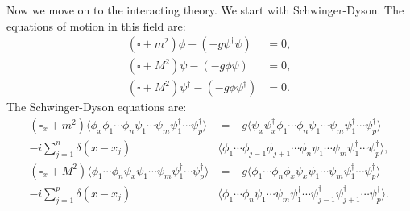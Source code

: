 \documentclass[12pt]{article}
\begin{document}
Now we move on to the interacting theory. We start with Schwinger-Dyson. The equations of motion in this field are:
\begin{align*}
	(\square + m^2) \phi - (-g \psi^{\dagger} \psi) &= 0, \\
	(\square + M^2) \psi - (-g \phi \psi) &= 0, \\
	(\square + M^2)\psi^{\dagger} - (-g \phi \psi^{\dagger}) &= 0.
\end{align*}
The Schwinger-Dyson equations are:
\begin{align*}
(\square_x + m^2) \langle\phi_x \phi_1 \cdots \phi_n \psi_1 \cdots \psi_m \psi_1^{\dagger} \cdots \psi_p^{\dagger}\rangle &= -g \langle \psi_x \psi_x^{\dagger} \phi_1 \cdots \phi_n \psi_1 \cdots \psi_m \psi_1^{\dagger} \cdots \psi_p^{\dagger}\rangle \\
- i \sum_{j= 1}^n \delta(x - x_j) &\langle \phi_1 \cdots \phi_{j-1} \phi_{j+1} \cdots \phi_n \psi_1 \cdots \psi_m \psi^{\dagger}_1 \cdots \psi_p^{\dagger}\rangle,\\
(\square_x + M^2) \langle\phi_1 \cdots \phi_n \psi_x \psi_1 \cdots \psi_m \psi_1^{\dagger} \cdots \psi_p^{\dagger}\rangle &= -g \langle \phi_1 \cdots \phi_n  \phi_x \psi_x \psi_1 \cdots \psi_m \psi_1^{\dagger} \cdots \psi_p^{\dagger}\rangle \\
- i \sum_{j= 1}^p \delta(x - x_j) &\langle \phi_1 \cdots \phi_n \psi_1 \cdots \psi_m \psi^{\dagger}_1 \cdots \psi_{j-1}^{\dagger} \psi_{j+1}^{\dagger} \cdots \psi_p^{\dagger}\rangle.
\end{align*}
\end{document}
